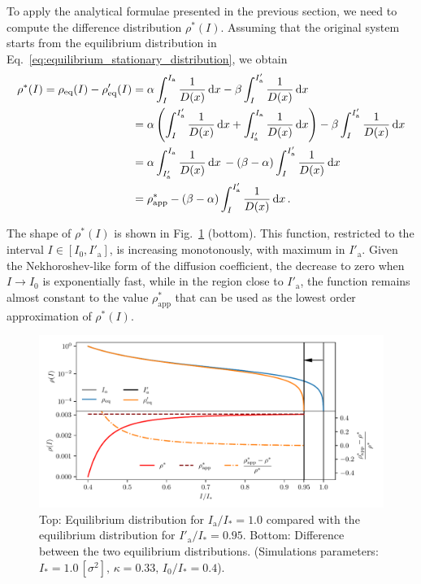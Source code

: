 To apply the analytical formulae presented in the previous section, we need to compute the difference distribution $\rho^\ast(I)$. Assuming that the original system starts from the equilibrium distribution in Eq.~\eqref{eq:equilibrium_stationary_distribution}, we obtain 
\begin{align}
    \rho^\ast(I) = \rho_\text{eq}(I) - \rho'_\text{eq}(I) 
    &= \alpha \int_I^{I_\mathrm{a}} \frac{1}{D(x)}\,\mathrm{d}x - \beta \int_I^{I'_\mathrm{a}} \frac{1}{D(x)}\,\mathrm{d}x \notag \\
    &= \alpha \left( 
          \int_{I}^{I'_\mathrm{a}} \frac{1}{D(x)}\,\mathrm{d}x 
        + \int_{I'_\mathrm{a}}^{I_\mathrm{a}} \frac{1}{D(x)}\,\mathrm{d}x \right) - \beta \int_I^{I'_\mathrm{a}} \frac{1}{D(x)}\,\mathrm{d}x \notag \\
    &=  \alpha \int_{I'_\mathrm{a}}^{I_\mathrm{a}} \frac{1}{D(x)}\,\mathrm{d}x \, - (\beta - \alpha) \int_{I}^{I'_\mathrm{a}} \frac{1}{D(x)}\,\mathrm{d}x \notag \\
    &=  \rho^\ast_\text{app} - (\beta - \alpha) \int_{I}^{I'_\mathrm{a}} \frac{1}{D(x)}\,\mathrm{d}x \, .
    \label{eq:inward_difference}
\end{align}

The shape of $\rho^\ast(I)$ is shown in Fig.~\ref{fig:4} (bottom). This function, restricted to the interval $I \in [I_0, I'_\mathrm{a}]$, is increasing monotonously, with maximum in $I'_\mathrm{a}$. Given the Nekhoroshev-like form of the diffusion coefficient, the decrease to zero when $I \to I_0$ is exponentially fast, while in the region close to $I'_\mathrm{a}$, the function remains almost constant to the value $\rho^\ast_\text{app}$ that can be used as the lowest order approximation of $\rho^\ast(I)$.

\begin{figure}[htp]
    \centering
    \includegraphics[width=\textwidth]{4_probing_the_diffusive_behavior/figs/final/difference_backwards_s.pdf}
    \caption{Top: Equilibrium distribution for $I_\mathrm{a}/I_\ast = 1.0$ compared with the  equilibrium distribution for $I'_\mathrm{a}/I_\ast = 0.95$. Bottom: Difference between the two equilibrium distributions. (Simulations parameters: $I_\ast = 1.0\,[\sigma^2],\, \kappa = 0.33,\, I_0/I_\ast = 0.4$).}
    \label{fig:4}
\end{figure}

